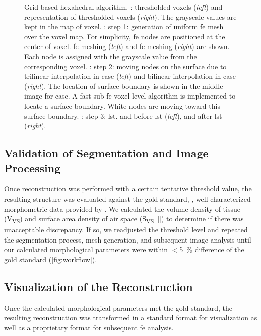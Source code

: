 \begin{figure}[p]
{{			\label{subfig:tsuda-04d}%
		}%
	}%
	\caption[Grid-based hexahedral algorithm]{Grid-based hexahedral algorithm. : \threed thresholded voxels (\emph{left}) and \twod representation of thresholded voxels (\emph{right}). The grayscale values are kept in the map of voxel. : step 1: generation of uniform \acl{fe} mesh over the voxel map. For simplicity, \ac{fe} nodes are positioned at the center of voxel. \threed \ac{fe} meshing (\emph{left}) and \twod \ac{fe} meshing (\emph{right}) are shown. Each node is assigned with the grayscale value from the corresponding voxel. : step 2: moving nodes on the surface due to trilinear interpolation in \threed case (\emph{left}) and bilinear interpolation in \twod case (\emph{right}). The location of surface boundary is shown in the middle image for \twod case. A fast sub \ac{fe}-voxel level algorithm is implemented to locate a surface boundary. White nodes are moving toward this surface boundary. : step 3: \acf{lst}. \threed and \twod before \ac{lst} (\emph{left}), \threed and \twod after \ac{lst} (\emph{right}).}
	\label{fig:tsuda-04}
\end{figure}%

\subsection[Validation of Segmentation]{Validation of Segmentation and Image Processing}
Once \threed reconstruction was performed with a certain tentative threshold value, the resulting \threed structure was evaluated against the gold standard, \ie, well-characterized morphometric data provided by \citet{Tschanz2003}. We calculated the volume density of tissue (V\textsubscript{VS}) and surface area density of air space (S\textsubscript{VS}~[\centimetresquared\per\centimetrecubed]) to determine if there was unacceptable discrepancy. If so, we readjusted the threshold level and repeated the segmentation process, mesh generation, and subsequent image analysis until our calculated morphological parameters were within $<$\SI{5}{\percent} difference of the gold standard (\autoref{fig:workflow}).

\subsection[Visualization of the Reconstruction]{Visualization of the \threed Reconstruction}
Once the calculated morphological parameters met the gold standard, the resulting \threed reconstruction was transformed in a standard  format for visualization as well as a proprietary  format for subsequent \ac{fe} analysis.


